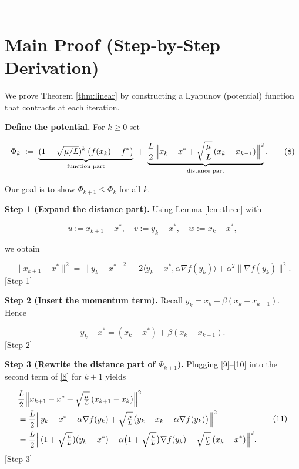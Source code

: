 \documentclass{article}
\newcommand{\grad}{\nabla}
\begin{document}
---------------------------------------------------------------------

\section*{Main Proof (Step‑by‑Step Derivation)}
We prove Theorem \ref{thm:linear} by constructing a Lyapunov (potential) function that contracts at each iteration.

\medskip
\noindent\textbf{Define the potential.}
For $k\ge0$ set  

\[
\Phi_{k}\;:=\; \underbrace{(1+\sqrt{\mu/L})^{k}\,\bigl(f(x_{k})-f^{\ast}\bigr)}_{\text{function part}}
\;+\;
\underbrace{\frac{L}{2}\Bigl\|x_{k}-x^{\ast}
      +\sqrt{\frac{\mu}{L}}\,(x_{k}-x_{k-1})\Bigr\|^{2}}_{\text{distance part}} .
\tag{8}
\]

Our goal is to show $\Phi_{k+1}\le \Phi_{k}$ for all $k$.

\medskip
\noindent\textbf{Step 1 (Expand the distance part).}  
Using Lemma \ref{lem:three} with  

\[
u:=x_{k+1}-x^{\ast},\quad
v:=y_{k}-x^{\ast},\quad
w:=x_{k}-x^{\ast},
\]

we obtain  

\[
\|x_{k+1}-x^{\ast}\|^{2}= \|y_{k}-x^{\ast}\|^{2}
        -2\langle y_{k}-x^{\ast},\alpha\grad f(y_{k})\rangle
        +\alpha^{2}\|\grad f(y_{k})\|^{2}.
\tag{9}
\] 
[Step 1]

\medskip
\noindent\textbf{Step 2 (Insert the momentum term).}  
Recall $y_{k}=x_{k}+\beta (x_{k}-x_{k-1})$. Hence  

\[
y_{k}-x^{\ast}= (x_{k}-x^{\ast})+\beta (x_{k}-x_{k-1}).
\tag{10}
\] 
[Step 2]

\medskip
\noindent\textbf{Step 3 (Rewrite the distance part of $\Phi_{k+1}$).}  
Plugging \eqref{9}–\eqref{10} into the second term of \eqref{8} for $k+1$ yields  

\[
\begin{aligned}
&\frac{L}{2}\Bigl\|x_{k+1}-x^{\ast}
      +\sqrt{\tfrac{\mu}{L}}\,(x_{k+1}-x_{k})\Bigr\|^{2}\\
&= \frac{L}{2}\Bigl\|y_{k}-x^{\ast}
      -\alpha\grad f(y_{k})
      +\sqrt{\tfrac{\mu}{L}}\bigl(y_{k}-x_{k}
      -\alpha\grad f(y_{k})\bigr)\Bigr\|^{2}\\
&= \frac{L}{2}\Bigl\|(1+\sqrt{\tfrac{\mu}{L}})(y_{k}-x^{\ast})
      -\alpha\bigl(1+\sqrt{\tfrac{\mu}{L}}\bigr)\grad f(y_{k})
      -\sqrt{\tfrac{\mu}{L}}\,(x_{k}-x^{\ast})\Bigr\|^{2}.
\end{aligned}
\tag{11}
\] 
[Step 3]
\end{document}
